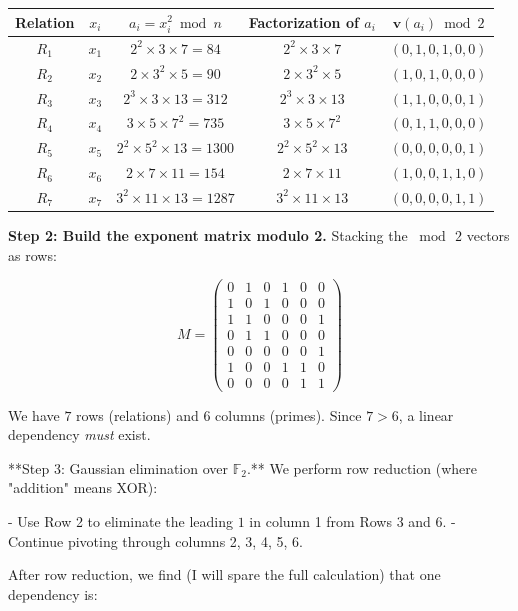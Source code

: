 \begin{center}
\small
\begin{tabular}{c c c c c}
\toprule
Relation & $x_i$ & $a_i = x_i^2 \bmod n$ & Factorization of $a_i$ & $\mathbf{v}(a_i) \bmod 2$ \\
\midrule
$R_1$ & $x_1$ & $2^2 \times 3 \times 7 = 84$ & $2^2 \times 3 \times 7$ & $(0, 1, 0, 1, 0, 0)$ \\
$R_2$ & $x_2$ & $2 \times 3^2 \times 5 = 90$ & $2 \times 3^2 \times 5$ & $(1, 0, 1, 0, 0, 0)$ \\
$R_3$ & $x_3$ & $2^3 \times 3 \times 13 = 312$ & $2^3 \times 3 \times 13$ & $(1, 1, 0, 0, 0, 1)$ \\
$R_4$ & $x_4$ & $3 \times 5 \times 7^2 = 735$ & $3 \times 5 \times 7^2$ & $(0, 1, 1, 0, 0, 0)$ \\
$R_5$ & $x_5$ & $2^2 \times 5^2 \times 13 = 1300$ & $2^2 \times 5^2 \times 13$ & $(0, 0, 0, 0, 0, 1)$ \\
$R_6$ & $x_6$ & $2 \times 7 \times 11 = 154$ & $2 \times 7 \times 11$ & $(1, 0, 0, 1, 1, 0)$ \\
$R_7$ & $x_7$ & $3^2 \times 11 \times 13 = 1287$ & $3^2 \times 11 \times 13$ & $(0, 0, 0, 0, 1, 1)$ \\
\bottomrule
\end{tabular}
\end{center}

\textbf{Step 2: Build the exponent matrix modulo 2.} Stacking the $\bmod\, 2$ vectors as rows:

\[
M = \begin{pmatrix} 0 & 1 & 0 & 1 & 0 & 0 \\ 1 & 0 & 1 & 0 & 0 & 0 \\ 1 & 1 & 0 & 0 & 0 & 1 \\ 0 & 1 & 1 & 0 & 0 & 0 \\ 0 & 0 & 0 & 0 & 0 & 1 \\ 1 & 0 & 0 & 1 & 1 & 0 \\ 0 & 0 & 0 & 0 & 1 & 1 \end{pmatrix}
\]

We have $7$ rows (relations) and $6$ columns (primes). Since $7 > 6$, a linear dependency \textit{must} exist.

**Step 3: Gaussian elimination over $\mathbb{F}_2$.** We perform row reduction (where "addition" means XOR):

- Use Row 2 to eliminate the leading $1$ in column 1 from Rows 3 and 6.
- Continue pivoting through columns 2, 3, 4, 5, 6.

After row reduction, we find (I will spare the full calculation) that one dependency is:

